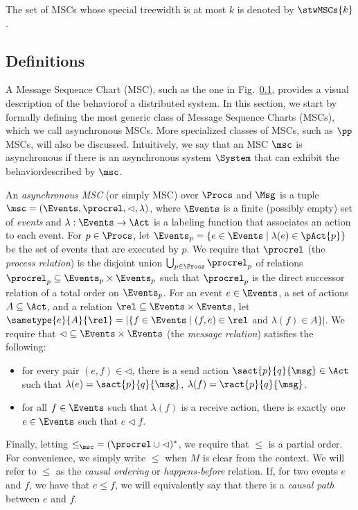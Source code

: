 The set of MSCs whose special treewidth is at most $k$ is denoted by $\stwMSCs{k}$.

\subsection{Definitions}

A Message Sequence Chart (MSC), such as the one in Fig.~\ref{}, provides a visual description of the behaviorof a distributed system. In this section, we start by formally defining the most generic class of Message Sequence Charts (MSCs), which we call asynchronous MSCs. More specialized classes of MSCs, such as $\pp$ MSCs, will also be discussed. Intuitively, we say that an MSC $\msc$ is asynchronous if there is an asynchronous system $\System$ that can exhibit the behaviordescribed by $\msc$.

\begin{definition}
An \emph{asynchronous MSC} (or simply MSC) over $\Procs$ and $\Msg$ is a tuple $\msc = (\Events,\procrel,\lhd,\lambda)$, where $\Events$ is a finite (possibly empty) set of \emph{events} and $\lambda: \Events \to \Act$ is a labeling function that associates an action to each event. For $p \in \Procs$, let $\Events_p = \{e \in \Events \mid \lambda(e) \in \pAct{p}\}$ be the set of events that are executed by $p$. We require that $\procrel$ (the \emph{process relation}) is the disjoint union $\bigcup_{p \in \Procs} \procrel_p$ of relations ${\procrel_p} \subseteq \Events_p \times \Events_p$ such that $\procrel_p$ is the direct successor relation of a total order on $\Events_p$. For an event $e \in \Events$, a set of actions $A \subseteq \Act$, and a relation $\rel \subseteq \Events \times \Events$,
let $\sametype{e}{A}{\rel} = |\{f \in \Events \mid (f,e) \in \rel$ and $\lambda(f) \in A\}|$. We require that ${\lhd} \subseteq \Events \times \Events$ (the \emph{message relation}) satisfies the following:
\begin{itemize}\itemsep=0.5ex
\item[(1)] for every pair $(e,f) \in {\lhd}$, there is a send action $\sact{p}{q}{\msg} \in \Act$ such that $\lambda(e) = \sact{p}{q}{\msg}$, $\lambda(f) = \ract{p}{q}{\msg}$.
\item[(2)] for all $f \in \Events$ such that $\lambda(f)$ is a receive action, there is exactly one $e \in \Events$ such that $e \lhd f$.
\end{itemize}
Finally, letting ${\le}_\msc = ({\procrel} \cup {\lhd})^\ast$,
we require that $\le$ is a partial order. For convenience, we simply write $\le$ when $M$ is clear from the context. We will refer to $\le$ as the \emph{causal ordering} or \emph{happens-before} relation. If, for two events $e$ and $f$, we have that $e \le f$, we will equivalently say that there is a \emph{causal path} between $e$ and $f$.
\end{definition}

